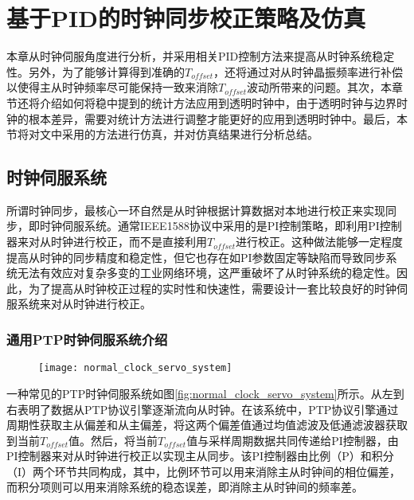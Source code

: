 
\chapter{基于PID的时钟同步校正策略及仿真}
本章从时钟伺服角度进行分析，并采用相关PID控制方法来提高从时钟系统稳定性。另外，为了能够计算得到准确的$T_{offset}$，还将通过对从时钟晶振频率进行补偿以使得主从时钟频率尽可能保持一致来消除$T_{offset}$波动所带来的问题。其次，本章节还将介绍如何将稳中提到的统计方法应用到透明时钟中，由于透明时钟与边界时钟的根本差异，需要对统计方法进行调整才能更好的应用到透明时钟中。最后，本节将对文中采用的方法进行仿真，并对仿真结果进行分析总结。

\section{时钟伺服系统}
所谓时钟同步，最核心一环自然是从时钟根据计算数据对本地进行校正来实现同步，即时钟伺服系统。通常IEEE1588协议中采用的是PI控制策略，即利用PI控制器来对从时钟进行校正，而不是直接利用$T_{offset}$进行校正。这种做法能够一定程度提高从时钟的同步精度和稳定性，但它也存在如PI参数固定等缺陷而导致同步系统无法有效应对复杂多变的工业网络环境，这严重破坏了从时钟系统的稳定性。因此，为了提高从时钟校正过程的实时性和快速性，需要设计一套比较良好的时钟伺服系统来对从时钟进行校正。

\subsection{通用PTP时钟伺服系统介绍}
\begin{figure}[hbp]
  \centering
  \begin{minipage}[b]{0.7\textwidth}
   \captionstyle{\centering}
   \centering
   \texttt{[image: normal\_clock\_servo\_system]}
  \end{minipage}
\end{figure}

一种常见的PTP时钟伺服系统如图\ref{fig:normal_clock_servo_system}所示。从左到右表明了数据从PTP协议引擎逐渐流向从时钟。在该系统中，PTP协议引擎通过周期性获取主从偏差和从主偏差，将这两个偏差值通过均值滤波及低通滤波器获取到当前$T_{offset}$值。然后，将当前$T_{offset}$值与采样周期数据共同传递给PI控制器，由PI控制器来对从时钟进行校正以实现主从同步。该PI控制器由比例（P）和积分（I）两个环节共同构成，其中，比例环节可以用来消除主从时钟间的相位偏差，而积分项则可以用来消除系统的稳态误差，即消除主从时钟间的频率差\supercite{58}。

